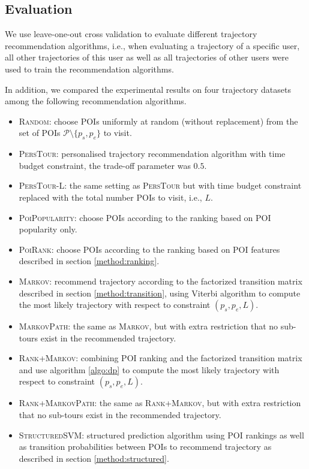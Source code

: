 \subsection{Evaluation}
We use leave-one-out cross validation to evaluate different trajectory recommendation algorithms,
i.e., when evaluating a trajectory of a specific user, all other trajectories of this user as well as 
all trajectories of other users were used to train the recommendation algorithms.

In addition, we compared the experimental results on four trajectory datasets among 
the following recommendation algorithms.
\begin{itemize}
\item \textsc{Random}: choose POIs uniformly at random (without replacement) 
      from the set of POIs $\mathcal{P} \setminus \{p_s, p_e \}$ to visit.
\item \textsc{PersTour}\cite{ijcai15}: personalised trajectory recommendation algorithm with time budget constraint,
      the trade-off parameter was $0.5$.
\item \textsc{PersTour-L}: the same setting as \textsc{PersTour} but with time budget constraint replaced with the 
      total number POIs to visit, i.e., $L$.
\item \textsc{PoiPopularity}: choose POIs according to the ranking based on POI popularity only.
\item \textsc{PoiRank}: choose POIs according to the ranking based on POI features described in section \ref{method:ranking}.
\item \textsc{Markov}: recommend trajectory according to the factorized transition matrix described in section \ref{method:transition},
      using Viterbi algorithm to compute the most likely trajectory with respect to constraint $(p_s, p_e, L)$.
\item \textsc{MarkovPath}: the same as \textsc{Markov}, but with extra restriction that 
      no sub-tours exist in the recommended trajectory.
\item \textsc{Rank+Markov}: combining POI ranking and the factorized transition matrix and use algorithm \ref{algo:dp} to 
      compute the most likely trajectory with respect to constraint $(p_s, p_e, L)$.
\item \textsc{Rank+MarkovPath}: the same as \textsc{Rank+Markov}, but with extra restriction that 
      no sub-tours exist in the recommended trajectory.
\item \textsc{StructuredSVM}: structured prediction algorithm using POI rankings as well as transition probabilities
      between POIs to recommend trajectory as described in section \ref{method:structured}.
\end{itemize}

